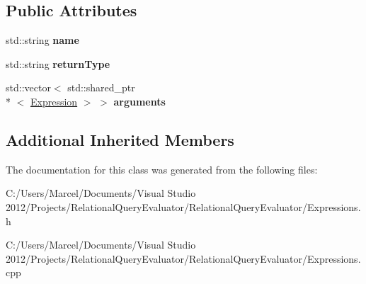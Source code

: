 \subsection*{Public Attributes}
\begin{DoxyCompactItemize}
\item 
\hypertarget{class_nnary_expression_ab21462327a70e8955c74cd8cc3fc428f}{std\+::string {\bfseries name}}\label{class_nnary_expression_ab21462327a70e8955c74cd8cc3fc428f}

\item 
\hypertarget{class_nnary_expression_a70b8058f410ed9f52b610e74489bf03f}{std\+::string {\bfseries return\+Type}}\label{class_nnary_expression_a70b8058f410ed9f52b610e74489bf03f}

\item 
\hypertarget{class_nnary_expression_ae70d24059bba49f089137557e18f41a9}{std\+::vector$<$ std\+::shared\+\_\+ptr\\*
$<$ \hyperlink{class_expression}{Expression} $>$ $>$ {\bfseries arguments}}\label{class_nnary_expression_ae70d24059bba49f089137557e18f41a9}

\end{DoxyCompactItemize}
\subsection*{Additional Inherited Members}


The documentation for this class was generated from the following files\+:\begin{DoxyCompactItemize}
\item 
C\+:/\+Users/\+Marcel/\+Documents/\+Visual Studio 2012/\+Projects/\+Relational\+Query\+Evaluator/\+Relational\+Query\+Evaluator/Expressions.\+h\item 
C\+:/\+Users/\+Marcel/\+Documents/\+Visual Studio 2012/\+Projects/\+Relational\+Query\+Evaluator/\+Relational\+Query\+Evaluator/Expressions.\+cpp\end{DoxyCompactItemize}
